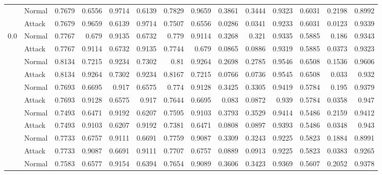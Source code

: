 \begin{tabular}{llrrrrrrrrrrrr}
                & Normal     &     0.7679 &      0.6556 &   0.9714 &        0.6139 &     0.7829 & 0.9659 & 0.3861 & 0.3444 &    0.9323 & 0.6031 & 0.2198 &   0.8992 \\
                & Attack     &     0.7679 &      0.9659 &   0.6139 &        0.9714 &     0.7507 & 0.6556 & 0.0286 & 0.0341 &    0.9233 & 0.6031 & 0.0123 &   0.9339 \\
 0.0            & Normal     &     0.7767 &      0.679  &   0.9135 &        0.6732 &     0.779  & 0.9114 & 0.3268 & 0.321  &    0.9335 & 0.5885 & 0.186  &   0.9343 \\
                & Attack     &     0.7767 &      0.9114 &   0.6732 &        0.9135 &     0.7744 & 0.679  & 0.0865 & 0.0886 &    0.9319 & 0.5885 & 0.0373 &   0.9323 \\
                & Normal     &     0.8134 &      0.7215 &   0.9234 &        0.7302 &     0.81   & 0.9264 & 0.2698 & 0.2785 &    0.9546 & 0.6508 & 0.1536 &   0.9606 \\
                & Attack     &     0.8134 &      0.9264 &   0.7302 &        0.9234 &     0.8167 & 0.7215 & 0.0766 & 0.0736 &    0.9545 & 0.6508 & 0.033  &   0.932  \\
                & Normal     &     0.7693 &      0.6695 &   0.917  &        0.6575 &     0.774  & 0.9128 & 0.3425 & 0.3305 &    0.9419 & 0.5784 & 0.195  &   0.9379 \\
                & Attack     &     0.7693 &      0.9128 &   0.6575 &        0.917  &     0.7644 & 0.6695 & 0.083  & 0.0872 &    0.939  & 0.5784 & 0.0358 &   0.947  \\
                & Normal     &     0.7493 &      0.6471 &   0.9192 &        0.6207 &     0.7595 & 0.9103 & 0.3793 & 0.3529 &    0.9414 & 0.5486 & 0.2159 &   0.9412 \\
                & Attack     &     0.7493 &      0.9103 &   0.6207 &        0.9192 &     0.7381 & 0.6471 & 0.0808 & 0.0897 &    0.9393 & 0.5486 & 0.0348 &   0.943  \\
                & Normal     &     0.7733 &      0.6757 &   0.9111 &        0.6691 &     0.7759 & 0.9087 & 0.3309 & 0.3243 &    0.9225 & 0.5823 & 0.1884 &   0.8991 \\
                & Attack     &     0.7733 &      0.9087 &   0.6691 &        0.9111 &     0.7707 & 0.6757 & 0.0889 & 0.0913 &    0.9225 & 0.5823 & 0.0383 &   0.9265 \\
                & Normal     &     0.7583 &      0.6577 &   0.9154 &        0.6394 &     0.7654 & 0.9089 & 0.3606 & 0.3423 &    0.9369 & 0.5607 & 0.2052 &   0.9378 \\

\end{tabular}
